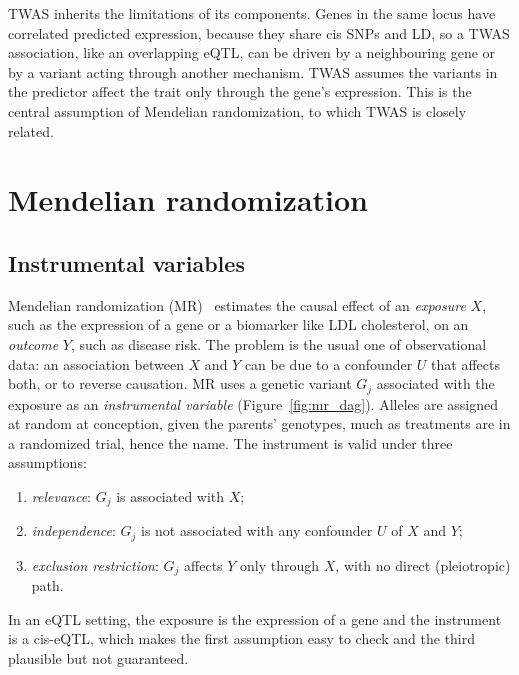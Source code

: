 TWAS inherits the limitations of its components. Genes in the same locus have correlated predicted expression, because they share cis SNPs and LD, so a TWAS association, like an overlapping eQTL, can be driven by a neighbouring gene or by a variant acting through another mechanism. TWAS assumes the variants in the predictor affect the trait only through the gene's expression. This is the central assumption of Mendelian randomization, to which TWAS is closely related.

\section{Mendelian randomization}

\subsection{Instrumental variables}

Mendelian randomization (MR)~\citep{daveysmith2003} estimates the causal effect of an \emph{exposure} $X$, such as the expression of a gene or a biomarker like LDL cholesterol, on an \emph{outcome} $Y$, such as disease risk. The problem is the usual one of observational data: an association between $X$ and $Y$ can be due to a confounder $U$ that affects both, or to reverse causation. MR uses a genetic variant $G_j$ associated with the exposure as an \emph{instrumental variable} (Figure~\ref{fig:mr_dag}). Alleles are assigned at random at conception, given the parents' genotypes, much as treatments are in a randomized trial, hence the name. The instrument is valid under three assumptions:
\begin{enumerate}
  \item \emph{relevance}: $G_j$ is associated with $X$;
  \item \emph{independence}: $G_j$ is not associated with any confounder $U$ of $X$ and $Y$;
  \item \emph{exclusion restriction}: $G_j$ affects $Y$ only through $X$, with no direct (pleiotropic) path.
\end{enumerate}
In an eQTL setting, the exposure is the expression of a gene and the instrument is a cis-eQTL, which makes the first assumption easy to check and the third plausible but not guaranteed.

